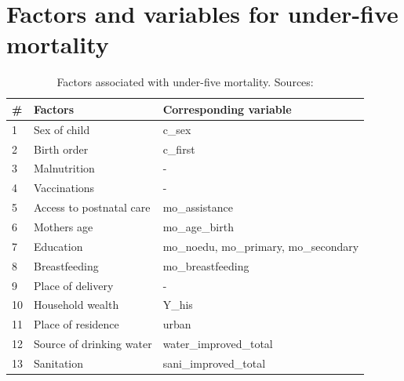 \documentclass[a4paper, 11pt]{article} %
\begin{document}
\section{Factors and variables for under-five mortality} \label{sec:appendix_tab_mortality}
\begin{table}[h!]
\begin{tabular}{@{}lll@{}}
\toprule
\# & \textbf{Factors} & \textbf{Corresponding variable} \\ \midrule
1 & Sex of child & c\_sex  \\
2 & Birth order & c\_first  \\ 
3 & Malnutrition & - \\ 
4 & Vaccinations & - \\ \midrule

5 & Access to postnatal care & mo\_assistance \\
6 & Mothers age & mo\_age\_birth \\
7 & Education & mo\_noedu, mo\_primary, mo\_secondary \\
8 & Breastfeeding & mo\_breastfeeding \\
9 & Place of delivery & - \\ \midrule

10 & Household wealth & Y\_his \\
11 & Place of residence  & urban \\ 
12 & Source of drinking water & water\_improved\_total  \\
13 & Sanitation &  sani\_improved\_total  \\ \bottomrule
\end{tabular}
    \caption{Factors associated with under-five mortality. Sources: \cite{Ettarh2012Mar}\cite{Who2020Sep}} \cite{UNICEF2006}
    \label{table:dead5}
\end{table}


\newpage
\end{document}
